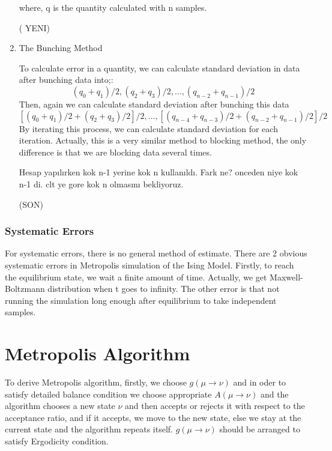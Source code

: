 \documentclass[12pt,fleqn]{report}
\begin{document}
\begin{enumerate}
where, q is the quantity calculated with n samples. 




( YENI)



\item The Bunching Method

To calculate error in a quantity, we can calculate standard deviation in data 
after bunching data into;:
$$(q_0 + q_1)/2,(q_2 + q_3)/2, ... , (q_{n-2} + q_{n-1})/2 $$
Then, again we can calculate standard deviation after bunching this data 
$$[(q_0 + q_1)/2 + (q_2 + q_3)/2]/2, ...
, [(q_{n-4} + q_{n-3})/2 + (q_{n-2} + q_{n-1})/2]/2$$
By iterating this process, we can calculate standard deviation for each 
iteration.  Actually, this is a very similar method to blocking method, the 
only difference is that we are blocking data several times.





Hesap yapılırken kok n-1 yerine kok n kullanıldı. Fark ne? onceden niye kok 
n-1 di. clt ye gore kok n olmasını bekliyoruz.

(SON)




\end{enumerate}

\subsubsection{Systematic Errors}

For systematic errors, there is no general method of estimate. There are 2 obvious systematic errors in Metropolis simulation of the Ising Model. Firstly, to reach the equilibrium state, we wait a finite amount of time. Actually, we get Maxwell-Boltzmann distribution when t goes to infinity. The other error is that not running the simulation long enough after equilibrium to take independent samples.

\section{Metropolis Algorithm}

To derive Metropolis algorithm, firstly, we choose $g(\mu \rightarrow \nu)$ and in oder to satisfy detailed balance condition we choose appropriate $A(\mu \rightarrow \nu)$ and the algorithm chooses a new state $\nu$ and then accepts or rejects it with respect to the acceptance ratio, and if it accepts, we move to the new state, else we stay at the current state and the algorithm repeats itself. $g(\mu \rightarrow \nu)$ should be arranged to satisfy Ergodicity condition. 
\end{document}
